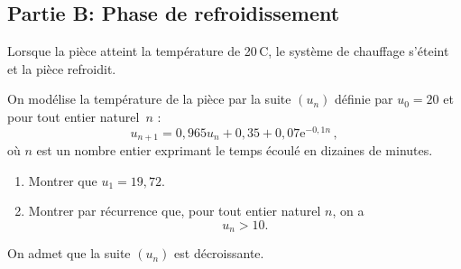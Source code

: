 \documentclass[10pt]{article}
\providecommand{\e}{{\mathrm{e}}}
\begin{document}
	\subsection*{Partie B: Phase de refroidissement}
		Lorsque la pièce atteint la température de 20\,\textdegree{}C, le système de chauffage s'éteint et la pièce refroidit.

		On modélise la température de la pièce par la suite $(u_{n})$ définie par $u_{0}=20$ et pour tout entier naturel~$n$ :
		\[u_{n+1}=0,965 u_{n}+0,35+0,07 \e^{-0,1 n}\,,\]
		où $n$ est un nombre entier exprimant le temps écoulé en dizaines de minutes.

		\begin{enumerate}
			\item Montrer que \quad $u_{1}=19,72$.

			\item Montrer par récurrence que, pour tout entier naturel $n$, on a
			\[u_{n}>10.\]
		\end{enumerate}

		On admet que la suite $(u_{n})$ est décroissante.
\end{document}
